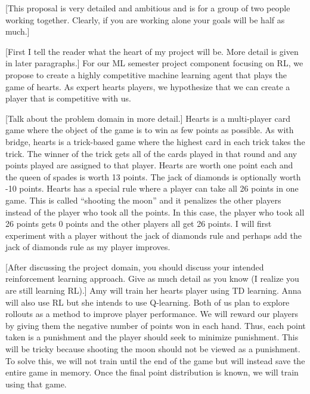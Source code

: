 \documentclass[nohyperref]{article}
\theoremstyle{plain}
\theoremstyle{definition}
\theoremstyle{remark}
\newcommand{\cnote}[1]{\textsf{\color{blue} [#1]}}
\begin{document}

\cnote{This proposal is very detailed and ambitious and is for a group of two people working together.  Clearly, if you are working alone your goals will be half as much.}

\cnote{First I tell the reader what the heart of my project will be.  More detail is given in later paragraphs.}  For our ML semester project component focusing on RL, we propose to create a highly competitive machine learning agent that plays the game of hearts.   As expert hearts players, we hypothesize that we can create a player that is competitive with us.  

\cnote{Talk about the problem domain in more detail.}  Hearts is a multi-player card game where the object of the game is to win as few points as possible.  As with bridge, hearts is a trick-based game where the highest card in each trick takes the trick.  The winner of the trick gets all of the cards played in that round and any points played are assigned to that player.  Hearts are worth one point each and the queen of spades is worth 13 points.  The jack of diamonds is optionally worth -10 points.  Hearts has a special rule where a player can take all 26 points in one game.  This is called ``shooting the moon'' and it penalizes the other players instead of the player who took all the points.  In this case, the player who took all 26 points gets 0 points and the other players all get 26 points.  I will first experiment with a player without the jack of diamonds rule and perhaps add the jack of diamonds rule as my player improves.  

\cnote{After discussing the project domain, you should discuss your intended reinforcement learning approach.  Give as much detail as you know (I realize you are still learning RL).}  Amy will train her hearts player using TD learning.  Anna will also use RL but she intends to use Q-learning.  Both of us plan to explore rollouts as a method to improve player performance.   We will reward our players by giving them the negative number of points won in each hand.  Thus, each point taken is a punishment and the player should seek to minimize punishment.  This will be tricky because shooting the moon should not be viewed as a punishment.  To solve this, we will not train until the end of the game but will instead save the entire game in memory.  Once the final point distribution is known, we will train using that game.  
\end{document}
